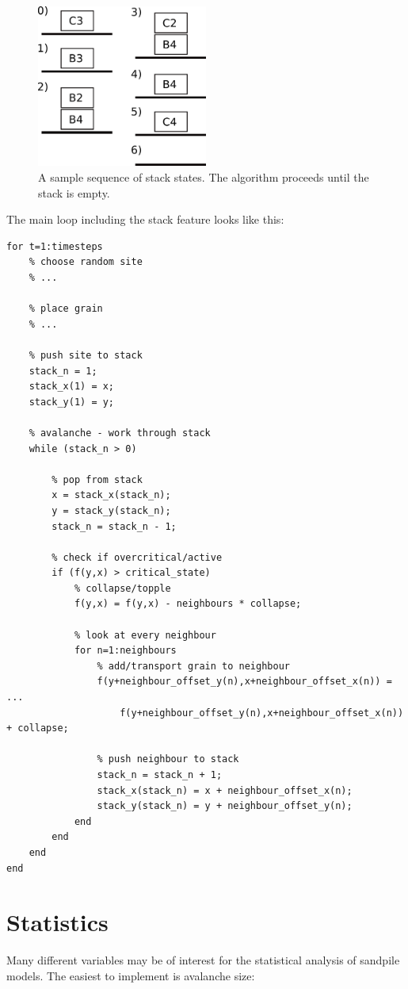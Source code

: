 \begin{figure}[!htpb]
\centering
\includegraphics[width=0.5\textwidth]{pics/pic2_stack1.pdf}
\caption[]{A sample sequence of stack states. The algorithm proceeds until the stack is empty.}
\label{pics:stack1}
\end{figure}

The main loop including the stack feature looks like this:
\begin{lstlisting}
for t=1:timesteps
	% choose random site
	% ...

	% place grain
	% ...

	% push site to stack
	stack_n = 1;
	stack_x(1) = x;
	stack_y(1) = y;

	% avalanche - work through stack
	while (stack_n > 0)

		% pop from stack
		x = stack_x(stack_n);
		y = stack_y(stack_n);
		stack_n = stack_n - 1;

		% check if overcritical/active
		if (f(y,x) > critical_state)
			% collapse/topple
			f(y,x) = f(y,x) - neighbours * collapse;

			% look at every neighbour
			for n=1:neighbours
				% add/transport grain to neighbour
				f(y+neighbour_offset_y(n),x+neighbour_offset_x(n)) = ...
					f(y+neighbour_offset_y(n),x+neighbour_offset_x(n)) + collapse;

				% push neighbour to stack
				stack_n = stack_n + 1;
				stack_x(stack_n) = x + neighbour_offset_x(n);
				stack_y(stack_n) = y + neighbour_offset_y(n);
			end
		end
	end
end
\end{lstlisting}


\section{Statistics}
Many different variables may be of interest for the statistical analysis of sandpile models. The easiest to implement is avalanche size:

